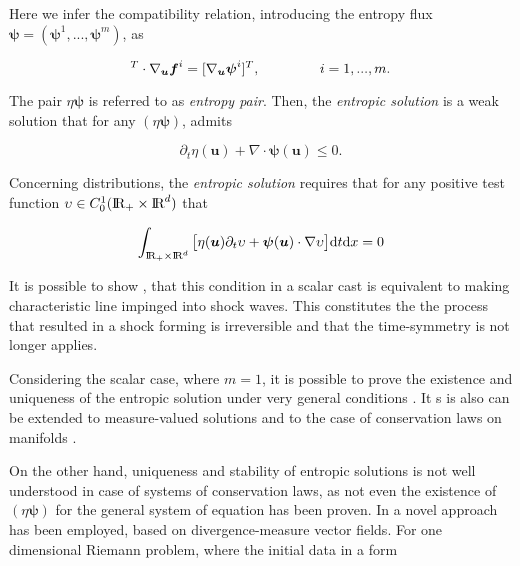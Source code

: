 Here we infer the compatibility relation, introducing the entropy flux $\boldsymbol{\psi} = (\boldsymbol{\psi}^1,...,\boldsymbol{\psi}^m)$, as 

\begin{equation}
[\nabla_{\boldsymbol{u}}\eta]^T\cdot\nabla_{\boldsymbol{u}}\boldsymbol{f}^i = [\nabla_{\boldsymbol{u}}\boldsymbol{\psi}^i]^T, \hspace{15mm} i = 1,...,m.
\end{equation}

The pair $\eta\boldsymbol{\psi}$ is referred to as \textit{entropy pair}. 
Then, the \textit{entropic solution} is a weak solution that for any $(\eta\boldsymbol{\psi})$, admits

\begin{equation}
\partial_t\eta(\boldsymbol{u}) + \nabla\cdot\boldsymbol{\psi}(\boldsymbol{u})\leq 0.
\end{equation}

Concerning distributions, the \textit{entropic solution} requires that for any positive test function $\upsilon\in C_0 ^1 (\text{I\!R}_+\times\text{I\!R}^d)$ that 

\begin{equation}
\int_{\text{I\!R}_+\times\text{I\!R}^d} \big[\eta(\boldsymbol{u})\partial_t\upsilon + \boldsymbol{\psi}(\boldsymbol{u}) \cdot \nabla\upsilon \big]\text{d}t\text{d}x = 0
\end{equation}

It is possible to show \citep{LeVeque:1992}, that this condition in a scalar cast is equivalent to making characteristic line impinged into shock waves. This constitutes the the process that resulted in a shock forming is irreversible and that the time-symmetry is not longer applies. 

Considering the scalar case, where $m=1$, it is possible to prove the existence and uniqueness of the entropic solution under very general conditions \citep{Kruzkov:1970}. It s is also can be extended to measure-valued solutions \citep{DiPerna:1985} and to the case of conservation laws on manifolds \citep{Benartzi:2007}. 

On the other hand, uniqueness and stability of entropic solutions is not well understood in case of systems of conservation laws, as not even the existence of $(\eta\boldsymbol{\psi})$ for the general system of equation has been proven. In \citet{Chen:2009} a novel approach has been employed, based on divergence-measure vector fields. 
For one dimensional Riemann problem, where the initial data in a form 


